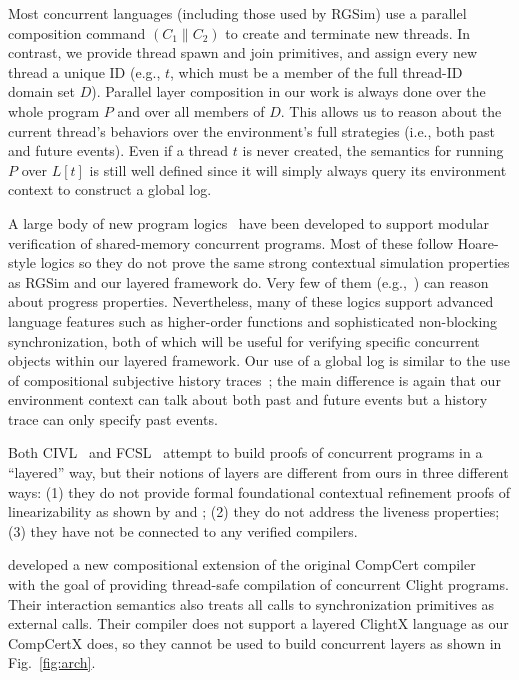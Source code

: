 Most concurrent languages (including those used by RGSim) use a
parallel composition command $(C_1 \| C_2)$ to create and terminate
new threads.  In contrast, we provide thread spawn and join
primitives, and assign every new thread a unique ID (e.g., $t$, which
must be a member of the full thread-ID domain set $D$). Parallel layer
composition in our work is always done over the whole program $P$ and over
all members of $D$. This allows us to reason about the current
thread's behaviors over the environment's full strategies (i.e., both
past and future events). Even if a thread $t$ is never
created, the semantics for running $P$ over $L[t]$ is still well
defined since it will simply always query its environment context to
construct a global log.

A large body of new program
logics~\cite{ohearn:concur04,brookes:concur04,feng07:sagl,vafeiadis:marriage,LRG,verifast,gotsman13,Turon13popl,Turon13icfp,nanevski13,nanevski14,sergey15,sergey15pldi,pinto14,iris15,civl15,pinto16,xu16}
have been developed to support modular verification of shared-memory
concurrent programs. Most of these follow Hoare-style logics so they
do not prove the same strong contextual simulation properties as RGSim
and our layered framework do. Very few of them (e.g.,~\cite{pinto16})
can reason about progress properties. Nevertheless, many of these
logics support advanced language features such as higher-order functions
and sophisticated non-blocking synchronization, both of which will be
useful for verifying specific concurrent objects within our layered
framework. Our use of a global log is similar to the use of compositional
subjective history traces~\cite{sergey15}; the main difference is
again that our environment context can talk about both past and future
events but a history trace can only specify past events.

Both CIVL~\cite{civl15} and FCSL~\cite{sergey15pldi} attempt to build
proofs of concurrent programs in a ``layered'' way, but their notions
of layers are different from ours in three different ways: (1) they do
not provide formal foundational contextual refinement proofs of
linearizability as shown by \citet{filipovic10} and \citet{liang13};
(2) they do not address the liveness properties; (3) they have not be
connected to any verified compilers.

\citet{stewart15} developed a new compositional extension of the
original CompCert compiler~\cite{compcert} with the goal of providing
thread-safe compilation of concurrent Clight programs.  Their
interaction semantics also treats all calls to synchronization
primitives as external calls. Their compiler does not support a layered
ClightX language as our CompCertX does, so they cannot be used
to build concurrent layers as shown in Fig.~\ref{fig:arch}. 

